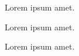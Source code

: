 \documentclass{article}
\begin{document}
Lorem ipsum  amet.

Lorem ipsum  amet.

Lorem ipsum  amet.
\end{document}
